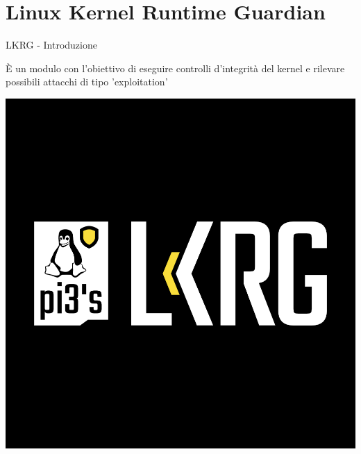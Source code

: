\documentclass[12pt]{beamer}
\begin{document}
  \section{Linux Kernel Runtime Guardian}
  \begin{frame}[fragile]{LKRG - Introduzione}
  	\begin{center}
    	È un modulo con l'obiettivo di eseguire controlli d'integrità del kernel e rilevare possibili attacchi di tipo 'exploitation'
    \end{center}
    \begin{center}
    	\includegraphics[scale=0.10]{res/Lkrg}
    \end{center}
  \end{frame}
\end{document}
